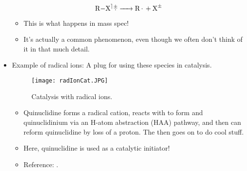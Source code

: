 \documentclass[../notes.tex]{subfiles}
\begin{document}
\begin{itemize}
\begin{equation*}
        \ce{R-X${}^\rceil\rca$ -> R* + X^{$\pm$}}
    \end{equation*}
    \begin{itemize}
        \item This is what happens in mass spec!
        \item It's actually a common phenomenon, even though we often don't think of it in that much detail.
    \end{itemize}
    \item Example of radical ions: A plug for using these species in catalysis.
    \begin{figure}[h!]
        \centering
        \texttt{[image: radIonCat.JPG]}
        \caption{Catalysis with radical ions.}
        \label{fig:radIonCat}
    \end{figure}
    \begin{itemize}
        \item Quinuclidine forms a radical cation, reacts with  to form  and quinuclidinium via an H-atom abstraction (HAA) pathway, and then can reform quinuclidine by loss of a proton. The  then goes on to do cool stuff.
        \item Here, quinuclidine is used as a catalytic initiator!
        \item Reference: \textcite{bib:radIonCat}.
    \end{itemize}
\end{itemize}
\end{document}
